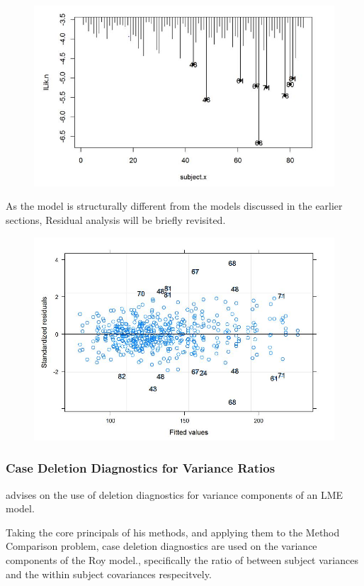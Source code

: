 \documentclass[12pt, a4paper]{report}
\theoremstyle{plain}
\theoremstyle{definition}
\theoremstyle{remark}
\begin{document}
	\begin{figure}[h!]
		\centering
		\includegraphics[width=0.7\linewidth]{images/LogLik-JS-Roy}
		\caption{}
		\label{fig:LogLik-JS-Roy}
	\end{figure}
		As the model is structurally different from the models discussed in the earlier sections, Residual analysis will be briefly revisited.
		\begin{figure}[h!]
			\centering
			\includegraphics[width=0.7\linewidth]{images/Residuals-JS-Roy}
			\caption{}
			\label{fig:Residuals-JS-Roy}
		\end{figure}

	

	
	

	

	
	\subsubsection{Case Deletion Diagnostics for Variance Ratios}
	
	\citet{schabenberger} advises on the use of deletion diagnostics for variance components of an LME model.
	
	Taking the core principals of his methods, and applying them to the Method Comparison problem, case deletion diagnostics are used on the variance components of the Roy model., specifically the ratio of between subject variances and the within subject covariances respecitvely.
	
\end{document}
